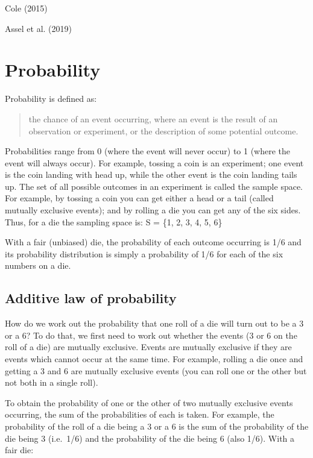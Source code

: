\documentclass[
  a4paper,
]{memoir}
\begin{document}
Cole (2015)

Assel et al. (2019)

\hypertarget{probability}{%
\section{Probability}\label{probability}}

Probability is defined as:

\begin{quote}
the chance of an event occurring, where an event is the result of an
observation or experiment, or the description of some potential outcome.
\end{quote}

Probabilities range from 0 (where the event will never occur) to 1
(where the event will always occur). For example, tossing a coin is an
experiment; one event is the coin landing with head up, while the other
event is the coin landing tails up. The set of all possible outcomes in
an experiment is called the sample space. For example, by tossing a coin
you can get either a head or a tail (called mutually exclusive events);
and by rolling a die you can get any of the six sides. Thus, for a die
the sampling space is: S = \{1, 2, 3, 4, 5, 6\}

With a fair (unbiased) die, the probability of each outcome occurring is
1/6 and its probability distribution is simply a probability of 1/6 for
each of the six numbers on a die.

\hypertarget{additive-law-of-probability}{%
\subsection{Additive law of
probability}\label{additive-law-of-probability}}

How do we work out the probability that one roll of a die will turn out
to be a 3 or a 6? To do that, we first need to work out whether the
events (3 or 6 on the roll of a die) are mutually exclusive. Events are
mutually exclusive if they are events which cannot occur at the same
time. For example, rolling a die once and getting a 3 and 6 are mutually
exclusive events (you can roll one or the other but not both in a single
roll).

To obtain the probability of one or the other of two mutually exclusive
events occurring, the sum of the probabilities of each is taken. For
example, the probability of the roll of a die being a 3 or a 6 is the
sum of the probability of the die being 3 (i.e.~1/6) and the probability
of the die being 6 (also 1/6). With a fair die:
\end{document}
